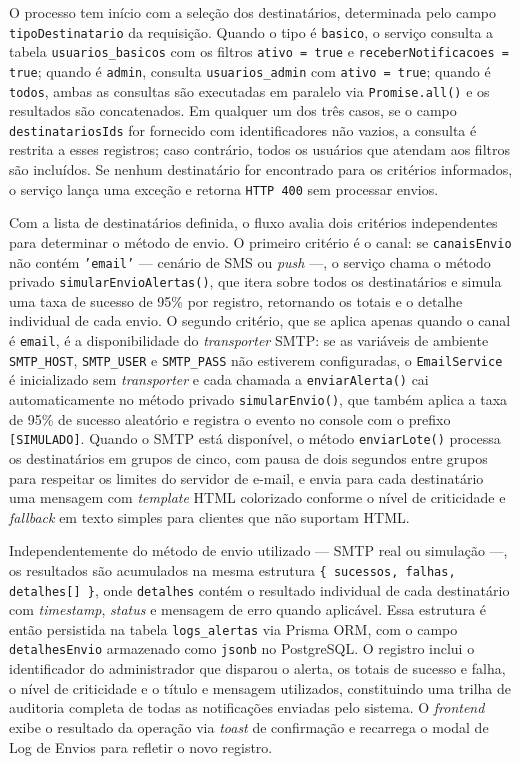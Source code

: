 O processo tem início com a seleção dos destinatários, determinada
pelo campo \texttt{tipoDestinatario} da requisição. Quando o tipo
é \texttt{basico}, o serviço consulta a tabela
\texttt{usuarios\_basicos} com os filtros \texttt{ativo = true} e
\texttt{receberNotificacoes = true}; quando é \texttt{admin},
consulta \texttt{usuarios\_admin} com \texttt{ativo = true}; quando
é \texttt{todos}, ambas as consultas são executadas em paralelo via
\texttt{Promise.all()} e os resultados são concatenados. Em qualquer
um dos três casos, se o campo \texttt{destinatariosIds} for fornecido
com identificadores não vazios, a consulta é restrita a esses
registros; caso contrário, todos os usuários que atendam aos filtros
são incluídos. Se nenhum destinatário for encontrado para os critérios
informados, o serviço lança uma exceção e retorna
\texttt{HTTP 400} sem processar envios.

Com a lista de destinatários definida, o fluxo avalia dois critérios
independentes para determinar o método de envio. O primeiro critério
é o canal: se \texttt{canaisEnvio} não contém \texttt{'email'} —
cenário de SMS ou \textit{push} —, o serviço chama o método privado
\texttt{simularEnvioAlertas()}, que itera sobre todos os destinatários
e simula uma taxa de sucesso de 95\% por registro, retornando os
totais e o detalhe individual de cada envio. O segundo critério, que
se aplica apenas quando o canal é \texttt{email}, é a disponibilidade
do \textit{transporter} SMTP: se as variáveis de ambiente
\texttt{SMTP\_HOST}, \texttt{SMTP\_USER} e \texttt{SMTP\_PASS}
não estiverem configuradas, o \texttt{EmailService} é inicializado
sem \textit{transporter} e cada chamada a \texttt{enviarAlerta()}
cai automaticamente no método privado \texttt{simularEnvio()}, que
também aplica a taxa de 95\% de sucesso aleatório e registra o evento
no console com o prefixo \texttt{[SIMULADO]}. Quando o SMTP está
disponível, o método \texttt{enviarLote()} processa os destinatários
em grupos de cinco, com pausa de dois segundos entre grupos para
respeitar os limites do servidor de e-mail, e envia para cada
destinatário uma mensagem com \textit{template} HTML colorizado
conforme o nível de criticidade e \textit{fallback} em texto
simples para clientes que não suportam HTML.

Independentemente do método de envio utilizado — SMTP real ou
simulação —, os resultados são acumulados na mesma estrutura
\texttt{\{ sucessos, falhas, detalhes[] \}}, onde \texttt{detalhes}
contém o resultado individual de cada destinatário com
\textit{timestamp}, \textit{status} e mensagem de erro quando
aplicável. Essa estrutura é então persistida na tabela
\texttt{logs\_alertas} via Prisma ORM, com o campo
\texttt{detalhesEnvio} armazenado como \texttt{jsonb} no
PostgreSQL. O registro inclui o identificador do administrador que
disparou o alerta, os totais de sucesso e falha, o nível de
criticidade e o título e mensagem utilizados, constituindo uma
trilha de auditoria completa de todas as notificações enviadas pelo
sistema. O \textit{frontend} exibe o resultado da operação via
\textit{toast} de confirmação e recarrega o modal de Log de Envios
para refletir o novo registro.